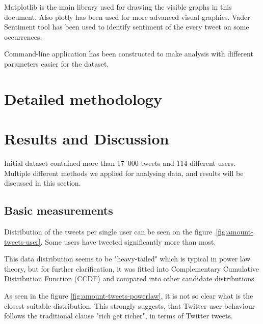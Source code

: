 \documentclass[conference]{IEEEtran}
\begin{document}
    Matplotlib\cite{4160265} is the main library used for drawing the visible graphs in this document.
    Also plotly\cite{plotly} has been used for more advanced visual graphics.
    Vader Sentiment\cite{Hutto_Gilbert_2014} tool has been used to identify sentiment of the every tweet on some occurrences.

    Command-line application has been constructed to make analysis with different parameters easier for the dataset.


    \section{Detailed methodology}\label{sec:detailed-methodology}

    


    \section{Results and Discussion}\label{sec:results-and-discussion}

    Initial dataset contained more than 17~000 tweets and 114 different users.
    Multiple different methods we applied for analysing data, and results will be discussed in this section.

    \subsection{Basic measurements}

    Distribution of the tweets per single user can be seen on the figure~\ref{fig:amount-tweets-user}.
    Some users have tweeted significantly more than most.

    This data distribution seems to be "heavy-tailed" which is typical in power law theory, but for further clarification,
    it was fitted into Complementary Cumulative Distribution Function (CCDF) and compared into other candidate distributions.

    As seen in the figure \ref{fig:amount-tweets-powerlaw}, it is not so clear what is the closest suitable distribution.
    This strongly suggests, that Twitter user behaviour follows the traditional clause "rich get richer", in terms of Twitter tweets.
\end{document}

